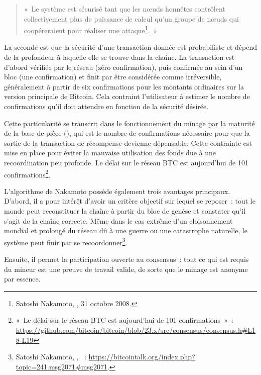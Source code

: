 \begin{quote}
«~Le système est sécurisé tant que les nœuds honnêtes contrôlent collectivement plus de puissance de calcul qu'un groupe de nœuds qui coopéreraient pour réaliser une attaque\footnote{Satoshi Nakamoto, , 31 octobre 2008.}.~»
\end{quote}

La seconde est que la sécurité d'une transaction donnée est probabiliste et dépend de la profondeur à laquelle elle se trouve dans la chaîne. La transaction est d'abord vérifiée par le réseau (zéro confirmation), puis confirmée au sein d'un bloc (une confirmation) et finit par être considérée comme irréversible, généralement à partir de six confirmations pour les montants ordinaires sur la version principale de Bitcoin. Cela contraint l'utilisateur à estimer le nombre de confirmations qu'il doit attendre en fonction de la sécurité désirée.

Cette particularité se transcrit dans le fonctionnement du minage par la maturité de la base de pièce (), qui est le nombre de confirmations nécessaire pour que la sortie de la transaction de récompense devienne dépensable. Cette contrainte est mise en place pour éviter la mauvaise utilisation des fonds due à une recoordination peu profonde. Le délai sur le réseau BTC est aujourd'hui de 101 confirmations\footnote{«~Le délai sur le réseau BTC est aujourd'hui de 101 confirmations~»~: \url{https://github.com/bitcoin/bitcoin/blob/23.x/src/consensus/consensus.h\#L18-L19}}.


L'algorithme de Nakamoto possède également trois avantages principaux. D'abord, il a pour intérêt d'avoir un critère objectif sur lequel se reposer~: tout le monde peut reconstituer la chaîne à partir du bloc de genèse et constater qu'il s'agit de la chaîne correcte. Même dans le cas extrême d'un cloisonnement mondial et prolongé du réseau dû à une guerre ou une catastrophe naturelle, le système peut finir par se recoordonner\footnote{Satoshi Nakamoto, , ~: \url{https://bitcointalk.org/index.php?topic=241.msg2071\#msg2071}.}.

Ensuite, il permet la participation ouverte au consensus~: tout ce qui est requis du mineur est une preuve de travail valide, de sorte que le minage est anonyme par essence.

